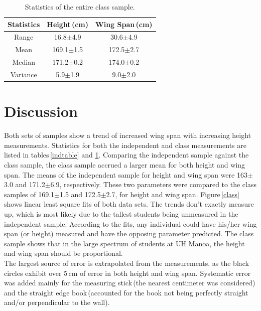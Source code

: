 \documentclass[twocolumn]{aastex6}
\begin{document}
\begin{table}[b]
\begin{center}
\caption{Statistics of the entire class sample.}

\begin{tabular}{ c|c|c }

Statistics & Height\,(cm)  & Wing Span\,(cm)\\ \hline \hline
Range & 16.8$\pm$4.9 & 30.6$\pm$4.9 \\
 Mean & 169.1$\pm$1.5 & 172.5$\pm$2.7 \\ 
 Median & 171.2$\pm$0.2 & 174.0$\pm$0.2 \\  
 Variance & 5.9$\pm$1.9 & 9.0$\pm$2.0 \\

\end{tabular}
\label{classtable}
\end{center}
\end{table}



\hfill\eject
\section{Discussion}
Both sets of samples show a trend of increased wing span with increasing height measurements. Statistics for both the independent and class measurements are listed in tables\,\ref{indtable} and \ref{classtable}. Comparing the independent sample against the class sample, the class sample accrued a larger mean for both height and wing span. The means of the independent sample for height and wing span were 163$\pm$3.0 and 171.2$\pm$6.9, respectively. These two parameters were compared to the class samples of 169.1$\pm$1.5 and 172.5$\pm$2.7, for height and wing span. Figure\,\ref{class} shows linear least square fits of both data sets. The trends don't exactly measure up, which is most likely due to the tallest students being unmeasured in the independent sample. According to the fits, any individual could have his/her wing span (or height) measured and have the opposing parameter predicted. The class sample shows that in the large spectrum of students at UH Manoa, the height and wing span should be proportional.
\\
\indent The largest source of error is extrapolated from the measurements, as the black circles exhibit over 5\,cm of error in both height and wing span. Systematic error was added mainly for the measuring stick\,(the nearest centimeter was considered) and the straight edge book\,(accounted for the book not being perfectly straight and/or perpendicular to the wall).
\end{document}
